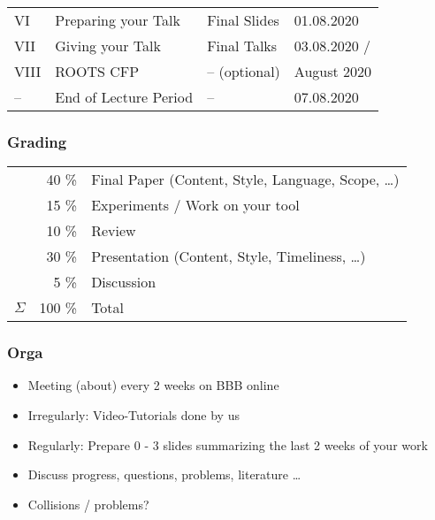\documentclass{i20lecture}
\begin{document}
\begin{frame}
\begin{center}
{\begin{tabular}{lp{4.9cm}ll}
      \alert{VI}  & Preparing your Talk     & Final Slides                         & \alert{01.08.2020} \\
      \alert{VII} & Giving your Talk        & Final Talks                          & \alert{03.08.2020} / \\
      \alert{VIII} & ROOTS CFP               & -- (optional)                        & \alert{August 2020} \\
      \midrule
      --          & End of Lecture Period   & --                                   & \alert{07.08.2020} \\
      \bottomrule
    \end{tabular}
    }
  \end{center}
\end{frame}

\begin{frame}[fragile]
  \frametitle{Grading}
  \begin{tabular}{lrl}
             & \alert{40 \%}   & Final Paper (Content, Style, Language, Scope, \ldots)\\
             & \alert{15 \%}   & Experiments / Work on your tool \\
             & \alert{10 \%}   & Review      \\
             & \alert{30 \%}   & Presentation (Content, Style, Timeliness, \ldots) \\
             & \alert{5 \%}    & Discussion                                                   \\
    \midrule
	$\Sigma$ & \alert{100 \%}  & Total                                                        \\
  \end{tabular}
\end{frame}

\begin{frame}
  \frametitle{Orga}
  \begin{itemize}
	  \item Meeting (about) every \alert{2} weeks on BBB \alert{online}
	  \item Irregularly: Video-Tutorials done by \alert{us}
	  \item Regularly: Prepare \alert{0} - \alert{3} slides summarizing the last 2 weeks of
		  your work
	  \item Discuss progress, questions, problems, literature \dots
	  \item Collisions / problems?
  \end{itemize}
\end{frame}
\end{document}
